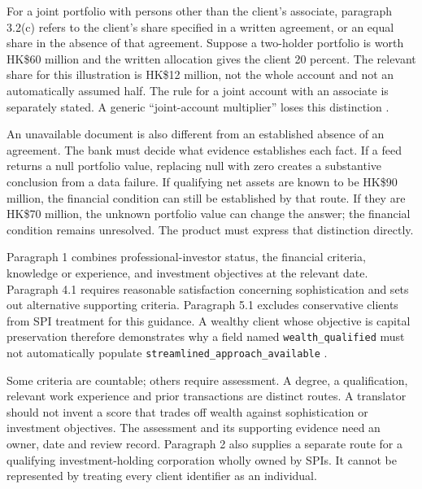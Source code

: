 For a joint portfolio with persons other than the client's associate, paragraph
3.2(c) refers to the client's share specified in a written agreement, or an equal
share in the absence of that agreement. Suppose a two-holder portfolio is worth
HK\$60 million and the written allocation gives the client 20 percent. The
relevant share for this illustration is HK\$12 million, not the whole account
and not an automatically assumed half. The rule for a joint account with an
associate is separately stated. A generic ``joint-account multiplier'' loses
this distinction \citep[Annex 1, para.~3.2]{sfcspiannex1}.

An unavailable document is also different from an established absence of an
agreement. The bank must decide what evidence establishes each fact. If a feed
returns a null portfolio value, replacing null with zero creates a substantive
conclusion from a data failure. If qualifying net assets are known to be
HK\$90 million, the financial condition can still be established by that route.
If they are HK\$70 million, the unknown portfolio value can change the answer;
the financial condition remains unresolved. The product must express that
distinction directly.

Paragraph 1 combines professional-investor status, the financial criteria,
knowledge or experience, and investment objectives at the relevant date.
Paragraph 4.1 requires reasonable satisfaction concerning sophistication and
sets out alternative supporting criteria. Paragraph 5.1 excludes conservative
clients from SPI treatment for this guidance. A wealthy client whose objective
is capital preservation therefore demonstrates why a field named
\texttt{wealth\_qualified} must not automatically populate
\texttt{streamlined\_approach\_available}
\citep[Annex 1, paras.~1, 4--5]{sfcspiannex1}.

Some criteria are countable; others require assessment. A degree, a qualification,
relevant work experience and prior transactions are distinct routes. A translator
should not invent a score that trades off wealth against sophistication or
investment objectives. The assessment and its supporting evidence need an owner,
date and review record. Paragraph 2 also supplies a separate route for a qualifying
investment-holding corporation wholly owned by SPIs. It cannot be represented by
treating every client identifier as an individual.

